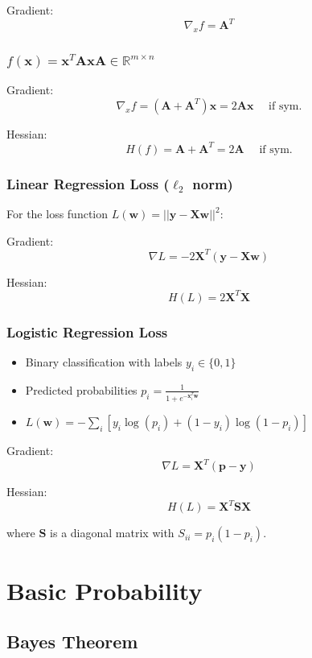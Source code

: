 \documentclass[8pt, a4paper, landscape, includeheadfoot]{extarticle}
\begin{document}
\begin{multicols*}{4}
	Gradient:
	$$
		\nabla_x f = \mathbf{A}^T
	$$

	\subsubsection{\( f(\mathbf{x}) = \mathbf{x}^T\mathbf{A}\mathbf{x} \)\hfill $\mathbf{A}\in\mathbb{R}^{m\times n}$}{}

	Gradient:
	$$
		\nabla_x f = (\mathbf{A} + \mathbf{A}^T)\mathbf{x} = 2\mathbf{Ax} \quad \text{ if sym.}
	$$

	Hessian:
	$$
		H(f) = \mathbf{A} + \mathbf{A}^T = 2\mathbf{A}\quad \text{ if sym.}
	$$

	\subsubsection{Linear Regression Loss (\( \ell_2 \) \textbf{norm})}{}
	For the loss function \( L(\mathbf{w}) = ||\mathbf{y} - \mathbf{X}\mathbf{w}||^2 \):

	Gradient:
	$$
		\nabla L = -2\mathbf{X}^T(\mathbf{y} - \mathbf{X}\mathbf{w})
	$$

	Hessian:
	$$
		H(L) = 2\mathbf{X}^T\mathbf{X}
	$$


	\subsubsection{Logistic Regression Loss}{}

	\begin{itemize}
		\item Binary classification with labels \( y_i \in \{0, 1\} \)
		\item Predicted probabilities \( p_i = \frac{1}{1 + e^{-\mathbf{x}_i^T \mathbf{w}}} \)
		\item \( L(\mathbf{w}) = -\sum_{i}[y_i \log(p_i) + (1-y_i) \log(1 - p_i)] \)
	\end{itemize}

	Gradient:
	$$
		\nabla L = \mathbf{X}^T(\mathbf{p} - \mathbf{y})
	$$

	Hessian:
	$$
		H(L) = \mathbf{X}^T \mathbf{S} \mathbf{X}
	$$

	where \( \mathbf{S} \) is a diagonal matrix with \( S_{ii} = p_i (1 - p_i) \).


	\section{Basic Probability}
	\subsection{Bayes Theorem}


\end{multicols*}
\end{document}
